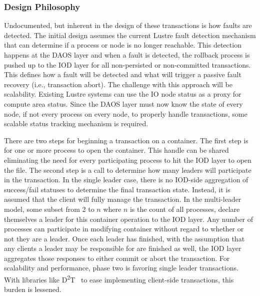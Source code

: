 \documentclass[conference]{IEEEtran} \pdfpagewidth=8.5in
\begin{document}
\subsubsection{Design Philosophy}

Undocumented, but inherent in the design of these transactions is how faults
are detected. The initial design assumes the current Lustre fault detection
mechanism that can determine if a process or node is no longer reachable. This
detection happens at the DAOS layer and when a fault is detected, the rollback
process is pushed up to the IOD layer for all non-persisted or non-committed
transactions. This defines how a fault will be detected and what will trigger a
passive fault recovery (i.e., transaction abort). The challenge with this
approach will be scalability. Existing Lustre systems can use the IO node
status as a proxy for compute area status. Since the DAOS layer must now know
the state of every node, if not every process on every node, to properly
handle transactions, some scalable status tracking mechanism is required.

There are two steps for beginning a transaction on a container. The first step
is for one or more process to open the container. This handle can be shared
eliminating the need for every participating process to hit the IOD layer to
open the file. The second step is a call to determine how many leaders will
participate in the transaction. In the single leader case, there is no
IOD-side aggregation of success/fail statuses to determine the final
transaction state.  Instead, it is assumed that the client will fully manage
the transaction. In the multi-leader model, some subset from 2 to $n$ where $n$
is the count of all processes, declare themselves a leader for this container
operation to the IOD layer. Any number of processes can participate in
modifying container without regard to whether or not they are a leader. Once
each leader has finished, with the assumption that any clients a leader may be
responsible for are finished as well, the IOD layer aggregates those responses
to either commit or abort the transaction. For scalability and performance,
phase two is favoring single leader transactions. With libraries like
D\textsuperscript{2}T~\cite{lofstead:2012:txn,lofstead:2013:pdsw-txn,lofstead:2014:txn}
to ease implementing client-side transactions, this burden is lessened.
\end{document}
